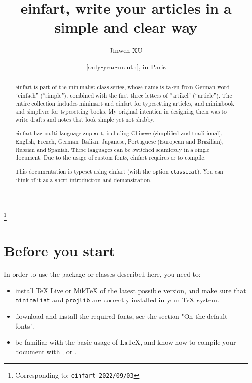 \documentclass[classical, simple name]{einfart}
\newcommand{\classoption}[1]{\texttt{\textcolor{code-option}{#1}}}
\providecommand{\minimalist}{\textsf{minimalist}}
\providecommand{\minimart}{\textsf{minimart}}
\providecommand{\minimbook}{\textsf{minimbook}}
\providecommand{\einfart}{\textsf{einfart}}
\providecommand{\simplivre}{\textsf{simplivre}}
\let\LevelOneTitle\section
\begin{document}
\def\PackageVersion{2022/09/03}

\title{\einfart{}, write your articles in a simple and clear way}
\author{Jinwen XU}
\thanks{Corresponding to: \texttt{\einfart{} \PackageVersion}}
\date{\TheDate{\PackageVersion}[only-year-month], in Paris}

\maketitle

\begin{abstract}
    \einfart{} is part of the \minimalist{} class series, whose name is taken from German word ``einfach'' (``simple''), combined with the first three letters of ``artikel'' (``article''). The entire collection includes \minimart{} and \einfart{} for typesetting articles, and \minimbook{} and \simplivre{} for typesetting books. My original intention in designing them was to write drafts and notes that look simple yet not shabby.

    \einfart{} has multi-language support, including Chinese (simplified and traditional), English, French, German, Italian, Japanese, Portuguese (European and Brazilian), Russian and Spanish. These languages can be switched seamlessly in a single document. Due to the usage of custom fonts, \einfart{} requires  or  to compile.

    This documentation is typeset using \einfart{} (with the option \classoption{classical}). You can think of it as a short introduction and demonstration.
\end{abstract}


\setcounter{tocdepth}{2}
\tableofcontents


\medskip
\LevelOneTitle*{Before you start}
In order to use the package or classes described here, you need to:
\begin{itemize}
    \item install TeX Live or MikTeX of the latest possible version, and make sure that \texttt{minimalist} and \texttt{projlib} are correctly installed in your \TeX{} system.
    \item download and install the required fonts, see the section "On the default fonts".
    \item be familiar with the basic usage of \LaTeX{}, and know how to compile your document with ,  or .
\end{itemize}
\end{document}
